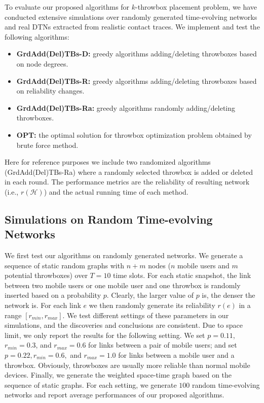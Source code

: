 \documentclass[10pt,conference,compsocconf,letterpaper]{IEEEtran}
\begin{document}
To evaluate our proposed algorithms for $k$-throwbox placement problem, we have conducted extensive simulations over randomly generated time-evolving networks and real DTNs extracted from realistic contact traces\cite{cambridge-haggle-imote-2009-05-29}. We implement and test the following algorithms:
\begin{itemize}
  \item \textbf{GrdAdd(Del)TBs-D:} greedy algorithms adding/deleting throwboxes based on node degrees.
  \item \textbf{GrdAdd(Del)TBs-R:} greedy algorithms adding/deleting throwboxes based on reliability changes.
  \item \textbf{GrdAdd(Del)TBs-Ra:} greedy algorithms randomly adding/deleting throwboxes.
  \item \textbf{OPT:} the optimal solution for throwbox optimization problem obtained by brute force method.
\end{itemize}
Here for reference purposes we include two randomized algorithms (GrdAdd(Del)TBs-Ra) where a randomly selected throwbox is added or deleted in each round. The performance metrics are the reliability of resulting network (i.e., $r(\mathcal{H})$) and the actual running time of each method.


\subsection{Simulations on Random Time-evolving Networks}
\label{sec:random}

We first test our algorithms on randomly generated networks. We generate a sequence of static random graphs with $n+m$ nodes ($n$ mobile users and $m$ potential throwboxes) over $T=10$ time slots. For each static snapshot,  the link between two mobile users or one mobile user and one throwbox is randomly inserted based on a probability $p$. Clearly, the larger value of $p$ is, the denser the network is. For each link $e$ we then randomly generate its reliability $r(e)$ in a range $[r_{min},r_{max}]$. We test different settings of these parameters in our simulations, and the discoveries and conclusions are consistent. Due to space limit, we only report the results for the following setting. We set $p=0.11$, $r_{min}=0.3$, and $r_{max}=0.6$ for links between a pair of mobile users; and set $p=0.22, r_{min}=0.6,$ and $r_{max}=1.0$ for links between a mobile user and a throwbox. Obviously, throwboxes are usually more reliable than normal mobile devices. Finally, we generate the weighted space-time graph based on the sequence of static graphs. For each setting, we generate $100$ random time-evolving networks and report average performances of our proposed algorithms.
\end{document}
